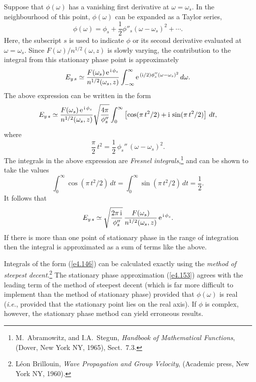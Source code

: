Suppose that $\phi(\omega)$ has a vanishing first derivative
at $\omega=\omega_s$. In the neighbourhood of this point,
$\phi(\omega)$ can be expanded as a Taylor series,
\begin{equation}
\phi(\omega) = \phi_s + \frac{1}{2} \phi''_s(\omega-\omega_s)^2+\cdots.
\end{equation}
Here, the subscript $s$ is used to indicate $\phi$ or its
second derivative evaluated at $\omega=\omega_s$. Since $F(\omega)/n^{1/2}(\omega,z)$
is slowly varying, the contribution to the integral from this
stationary phase point is approximately
\begin{equation}
E_{y\,s} \simeq \frac{F(\omega_s) \,{\rm e}^{\,{\rm i}\,\phi_s}}{n^{1/2}(\omega_s,z)}
\int_{-\infty}^{\infty} {\rm e}^{\,({\rm i}/2)\phi_s''(\omega-\omega_s)^2}\,d\omega.
\end{equation}
The above expression can be written in the form
\begin{equation}
E_{y\,s}\simeq  \frac{F(\omega_s) \,{\rm e}^{\,{\rm i}\,\phi_s}}{n^{1/2}(\omega_s,z)}
\sqrt{\frac{4\pi}{\phi_s''}}\int_0^\infty \left[
\cos(\pi \,t^2/2)+{\rm i}\,\sin(\pi\, t^2/2)\right]\,dt,
\end{equation}
where
\begin{equation}
\frac{\pi}{2}\, t^2 = \frac{1}{2}\, \phi_s'' \,(\omega-\omega_s)^2.
\end{equation}
The integrals in the above expression are
{\em Fresnel integrals},\footnote{M.~Abramowitz,
and I.A.~Stegun, {\em Handbook of Mathematical Functions}, (Dover, New York NY, 
1965), Sect.~7.3.} and can be shown to take the values
\begin{equation}
\int_0^\infty\cos(\pi \,t^2/2)\,dt = \int_0^\infty\sin(\pi\, t^2/2)\,dt
=\frac{1}{2}.
\end{equation}
It follows that
\begin{equation}\label{e4.153}
E_{y\,s}\simeq  \sqrt{\frac{2\pi\,{\rm i}}{\phi_s''}}
\, \frac{F(\omega_s)}{n^{1/2}(\omega_s, z)} \,{\rm e}^{\,{\rm i}\,\phi_s}.
\end{equation}
If there is more than one point of stationary phase in the range
of integration then the integral is approximated as a sum of terms like the
above. 

Integrals of the form (\ref{e4.146}) can be calculated exactly using the
{\em method of steepest decent}.\footnote{L\'{e}on Brillouin, 
{\em Wave Propagation and Group Velocity},
(Academic press, New York NY, 1960).} The stationary
phase approximation (\ref{e4.153}) agrees with the leading term of the
method of steepest decent (which is far more difficult to implement
than the method of stationary phase) provided that $\phi(\omega)$ is
real ({\em i.e.}, provided that
the stationary point lies on the real axis). If $\phi$ is complex, however, the stationary phase
method can yield erroneous results. 

